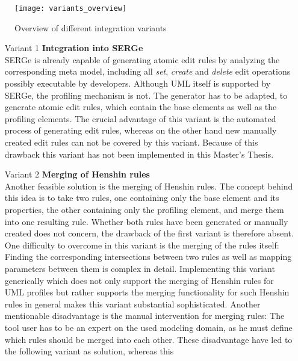 \begin{figure}[h!]
\begin{center}
\texttt{[image: variants\_overview]}\\
\end{center}
\caption{Overview of different integration variants}
\label{variants_overview}
\end{figure}

\begin{enumerate}
  \item[Variant 1] \textbf{Integration into \ac{SERGe}}\\
 \ac{SERGe} is already capable of generating atomic edit rules by analyzing the
 corresponding meta model, including all \textit{set}, \textit{create}
 and \textit{delete} edit operations possibly executable by developers. Although
 \ac{UML} itself is supported by \ac{SERGe}, the profiling mechanism is not. The
 generator has to be adapted, to generate atomic edit rules, which contain the
 base elements as well as the profiling elements. The crucial advantage of this
 variant is the automated process of generating edit rules, whereas on the other
 hand new manually created edit rules can not be covered by this variant.
 Because of this drawback this variant has not been implemented in this Master's
 Thesis.
  \item[Variant 2] \textbf{Merging of Henshin rules}\\
  Another feasible solution is the merging of Henshin rules. The concept behind
  this idea is to take two rules, one containing only the base element and its
  properties, the other containing only the profiling element, and merge them
  into one resulting rule. Whether both rules have been generated or manually
  created does not concern, the drawback of the first variant is therefore absent.
  One difficulty to overcome in this variant is the merging of the rules
  itself: Finding the corresponding intersections between two rules as
  well as mapping parameters between them is complex in detail. Implementing
  this variant generically which does not only support the merging of Henshin
  rules for \ac{UML} profiles but rather supports the merging functionality for
  such Henshin rules in general makes this variant substantial sophisticated.
  Another mentionable disadvantage is the manual intervention for merging rules:
  The tool user has to be an expert on the used modeling domain, as he must
  define which rules should be merged into each other. These disadvantage have
  led to the following variant as solution, whereas this 

\end{enumerate}
